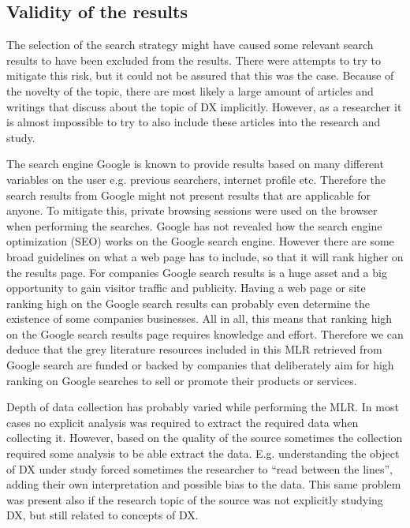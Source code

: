 \documentclass[english, 12pt, a4paper, sci, utf8, a-1b, online]{aaltothesis}
\begin{document}
\subsection{Validity of the results}

The selection of the search strategy might have caused some relevant search results to have been excluded from the results. There were attempts to try to mitigate this risk, but it could not be assured that this was the case. Because of the novelty of the topic, there are most likely a large amount of articles and writings that discuss about the topic of DX implicitly. However, as a researcher it is almost impossible to try to also include these articles into the research and study.

The search engine Google is known to provide results based on many different variables on the user e.g. previous searchers, internet profile etc. Therefore the search results from Google might not present results that are applicable for anyone. To mitigate this, private browsing sessions were used on the browser when performing the searches. Google has not revealed how the search engine optimization (SEO) works on the Google search engine. However there are some broad guidelines on what a web page has to include, so that it will rank higher on the results page. For companies Google search results is a huge asset and a big opportunity to gain visitor traffic and publicity. Having a web page or site ranking high on the Google search results can probably even determine the existence of some companies businesses. All in all, this means that ranking high on the Google search results page requires knowledge and effort. Therefore we can deduce that the grey literature resources included in this MLR retrieved from Google search are funded or backed by companies that deliberately aim for high ranking on Google searches to sell or promote their products or services.

Depth of data collection has probably varied while performing the MLR. In most cases no explicit analysis was required to extract the required data when collecting it. However, based on the quality of the source sometimes the collection required some analysis to be able extract the data. E.g. understanding the object of DX under study forced sometimes the researcher to ``read between the lines'', adding their own interpretation and possible bias to the data. This same problem was present also if the research topic of the source was not explicitly  studying DX, but still related to concepts of DX.
\end{document}
